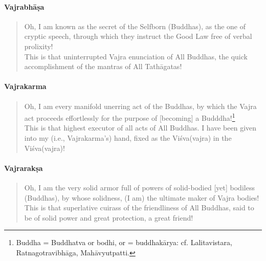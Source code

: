 \documentclass[11pt]{book}
\newcommand{\red}[1]{\textcolor{red}{#1}}
\begin{document}

\paragraph{Vajrabhāṣa}

\begin{verse}
Oh, I am known as the secret of the Selfborn (Buddhas), as the one of cryptic speech, through which they instruct the Good Law free of verbal prolixity!\\
This is that uninterrupted Vajra enunciation of All Buddhas, the quick accomplishment of the mantras of All Tathāgatas!
\end{verse}

\paragraph{Vajrakarma}

\begin{verse}
Oh, I am every manifold unerring act of the Buddhas, by which the Vajra act proceeds effortlessly for the purpose of [becoming] a Budddha!\footnote{Buddha = Buddhatva or bodhi, or = buddhakārya: cf. Lalitavistara, Ratnagotravibhāga, Mahāvyutpatti.}\\
This is that highest executor of all acts of All Buddhas. I have been given into my (i.e., Vajrakarma's) hand, fixed as the Viśva(vajra) in the Viśva(vajra)! 
\end{verse}

\paragraph{Vajrarakṣa}

\begin{verse}
Oh, I am the very solid armor full of powers of solid-bodied [yet] bodiless (Buddhas), by whose solidness, (I am) the ultimate maker of Vajra bodies!\\
This is that superlative cuirass of the friendliness of All Buddhas, said to be of solid power and great protection, a great friend!
\end{verse}
\end{document}
